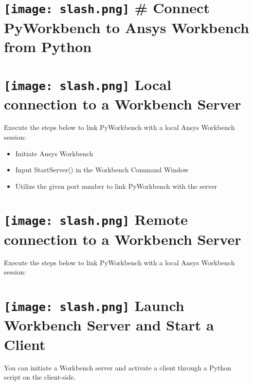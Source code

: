 \documentclass[9pt,landscape]{article}
\begin{document}
\begin{multicols}{3}
\setlength{\premulticols}{1pt}
\setlength{\postmulticols}{1pt}
\setlength{\multicolsep}{1pt}
\setlength{\columnsep}{2pt}

\vfill
\section{\texttt{[image: slash.png]} # Connect PyWorkbench to Ansys Workbench from Python}


\section{\texttt{[image: slash.png]} Local connection to a Workbench Server}
Execute the steps below to link PyWorkbench with a local Ansys Workbench session:

\begin{itemize}
\item Initiate Ansys Workbench  
\item Input StartServer() in the Workbench Command Window 
\item Utilize the given port number to link PyWorkbench with the server
\end{itemize}    


\section{\texttt{[image: slash.png]} Remote connection to a Workbench Server}
Execute the steps below to link PyWorkbench with a local Ansys Workbench session:

\section{\texttt{[image: slash.png]} Launch Workbench Server and Start a Client}
You can initiate a Workbench server and activate a client through a Python script on the client-side.


\end{multicols}
\end{document}
